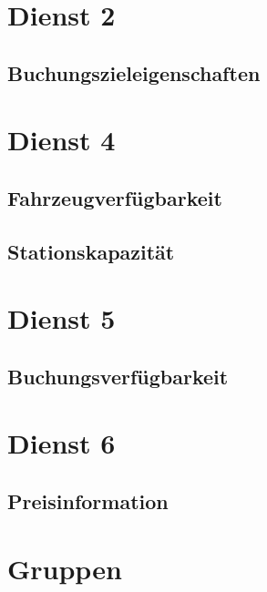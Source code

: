 \section{Dienst 2}
\label{subsec:Datenmodell:Dienst2}

\subsection*{Buchungszieleigenschaften}





\section{Dienst 4}
\label{subsec:Datenmodell:Dienst4}

\subsection*{Fahrzeugverfügbarkeit}


\subsection*{Stationskapazität}



\section{Dienst 5}
\label{subsec:Datenmodell:Dienst5}

\subsection*{Buchungsverfügbarkeit}



\section{Dienst 6}
\label{subsec:Datenmodell:Dienst6}

\subsection*{Preisinformation}


\section{Gruppen}

